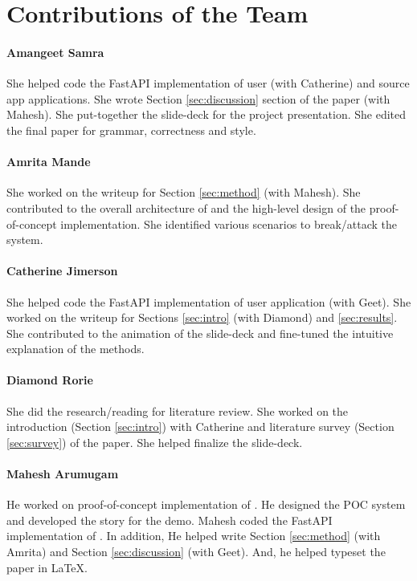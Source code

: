 \section*{Contributions of the Team}
\label{sec:contributions}

\paragraph{Amangeet Samra}
She helped code the FastAPI implementation of user (with Catherine) and source app applications. She wrote Section \ref{sec:discussion} section of the paper (with Mahesh). She put-together the slide-deck for the project presentation. She edited the final paper for grammar, correctness and style.

\paragraph{Amrita Mande}
She worked on the writeup for Section \ref{sec:method} (with Mahesh). She contributed to the overall architecture of \name and the high-level design of the proof-of-concept implementation. She identified various scenarios to break/attack the system. 

\paragraph{Catherine Jimerson}
She helped code the FastAPI implementation of user application (with Geet). She worked on the writeup for Sections \ref{sec:intro} (with Diamond) and \ref{sec:results}. She contributed to the animation of the slide-deck and fine-tuned the intuitive explanation of the methods. 

\paragraph{Diamond Rorie}
She did the research/reading for literature review. She worked on the introduction (Section \ref{sec:intro}) with Catherine and literature survey (Section \ref{sec:survey}) of the paper. She helped finalize the slide-deck.

\paragraph{Mahesh Arumugam}
He worked on proof-of-concept implementation of \name. He designed the POC system and developed the story for the demo. Mahesh coded the FastAPI implementation of \ta. In addition, He helped write Section \ref{sec:method} (with Amrita) and Section \ref{sec:discussion} (with Geet). And, he helped typeset the paper in LaTeX.
